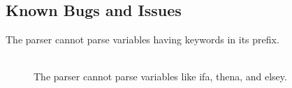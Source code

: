 \subsection{Known Bugs and Issues}

\begin{description}
    \item[The parser cannot parse variables having keywords in its prefix. ]~\\
        The parser cannot parse variables like ifa, thena, and elsey.
\end{description}
